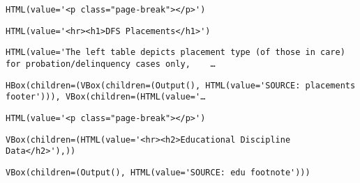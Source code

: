 \documentclass[11pt]{article}
\begin{document}
    
    
    \begin{verbatim}
HTML(value='<p class="page-break"></p>')
    \end{verbatim}

    
    
    \begin{verbatim}
HTML(value='<hr><h1>DFS Placements</h1>')
    \end{verbatim}

    
    
    \begin{verbatim}
HTML(value='The left table depicts placement type (of those in care) for probation/delinquency cases only,    …
    \end{verbatim}

    
    
    \begin{verbatim}
HBox(children=(VBox(children=(Output(), HTML(value='SOURCE: placements footer'))), VBox(children=(HTML(value='…
    \end{verbatim}

    
    
    \begin{verbatim}
HTML(value='<p class="page-break"></p>')
    \end{verbatim}

    
    
    \begin{verbatim}
VBox(children=(HTML(value='<hr><h2>Educational Discipline Data</h2>'),))
    \end{verbatim}

    
    
    \begin{verbatim}
VBox(children=(Output(), HTML(value='SOURCE: edu footnote')))
    \end{verbatim}
\end{document}
